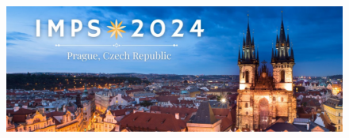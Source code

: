\documentclass[a0,portrait]{a0poster}
\begin{document}
\begin{figure}[h]
\begin{minipage}{.15\linewidth}
\end{minipage}
\hspace{\fill} %
\begin{minipage}{.24\linewidth}
  \includegraphics[width=20cm]{Poster TEX/style/IMPS.png}
\end{minipage}
\end{figure}
\end{document}
